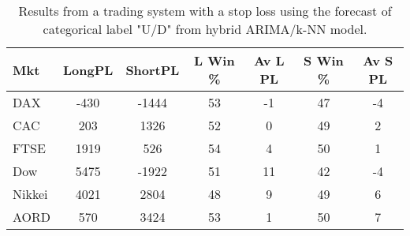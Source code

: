 \begin{table}[ht]
\centering
\caption[Results from a trading system with a stop loss using the forecast of categorical label "U/D" from hybrid ARIMA/k-NN model]{Results from a trading system with a stop loss using the forecast of categorical label "U/D" from hybrid ARIMA/k-NN model.} 
\label{tab:chp_ts:pUD_CAT_arima_knn_sys_SL}
\begin{tabular}{lcccccc}
  \toprule Mkt & LongPL & ShortPL & L Win \% & Av L PL & S Win \% & Av S PL \\ 
  \midrule DAX & -430 & -1444 & 53 & -1 & 47 & -4 \\ 
  CAC & 203 & 1326 & 52 & 0 & 49 & 2 \\ 
  FTSE & 1919 & 526 & 54 & 4 & 50 & 1 \\ 
  Dow & 5475 & -1922 & 51 & 11 & 42 & -4 \\ 
  Nikkei & 4021 & 2804 & 48 & 9 & 49 & 6 \\ 
  AORD & 570 & 3424 & 53 & 1 & 50 & 7 \\ 
   \bottomrule \end{tabular}
\end{table}
